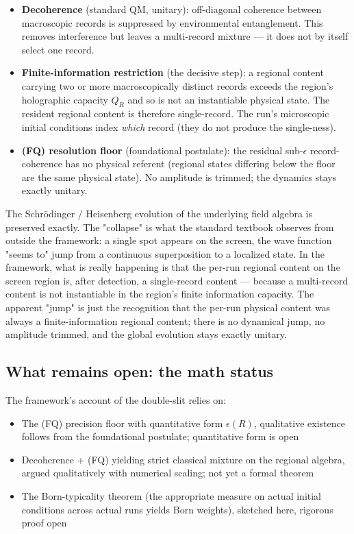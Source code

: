 \documentclass[11pt,a4paper]{article}
\begin{document}
\begin{itemize}
  \item \textbf{Decoherence} (standard QM, unitary): off-diagonal coherence between macroscopic records is suppressed by environmental entanglement. This removes interference but leaves a multi-record mixture — it does not by itself select one record.
  \item \textbf{Finite-information restriction} (the decisive step): a regional content carrying two or more macroscopically distinct records exceeds the region's holographic capacity $Q_R$ and so is not an instantiable physical state. The resident regional content is therefore single-record. The run's microscopic initial conditions index \emph{which} record (they do not produce the single-ness).
  \item \textbf{(FQ) resolution floor} (foundational postulate): the residual sub-$\epsilon$ record-coherence has no physical referent (regional states differing below the floor are the same physical state). No amplitude is trimmed; the dynamics stays exactly unitary.
\end{itemize}

The Schrödinger / Heisenberg evolution of the underlying field algebra is preserved exactly. The "collapse" is what the standard textbook observes from outside the framework: a single spot appears on the screen, the wave function "seems to" jump from a continuous superposition to a localized state. In the framework, what is really happening is that the per-run regional content on the screen region is, after detection, a single-record content — because a multi-record content is not instantiable in the region's finite information capacity. The apparent "jump" is just the recognition that the per-run physical content was always a finite-information regional content; there is no dynamical jump, no amplitude trimmed, and the global evolution stays exactly unitary.

\subsection{What remains open: the math status}

The framework's account of the double-slit relies on:
\begin{itemize}
  \item The (FQ) precision floor with quantitative form $\epsilon(R)$, qualitative existence follows from the foundational postulate; quantitative form is open
  \item Decoherence + (FQ) yielding strict classical mixture on the regional algebra, argued qualitatively with numerical scaling; not yet a formal theorem
  \item The Born-typicality theorem (the appropriate measure on actual initial conditions across actual runs yields Born weights), sketched here, rigorous proof open
\end{itemize}
\end{document}
